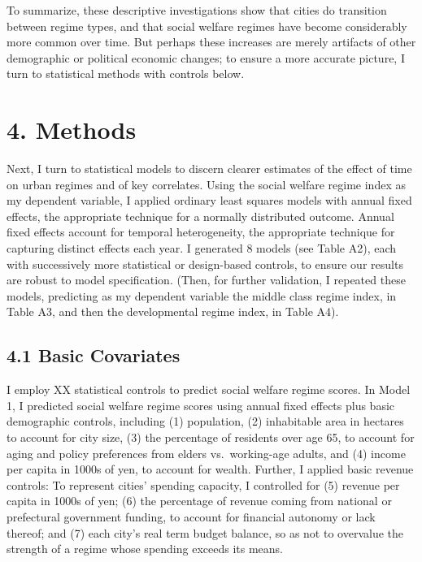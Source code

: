 \documentclass[preprint, 3p,
authoryear]{elsarticle} %
\begin{document}
To summarize, these descriptive investigations show that cities do
transition between regime types, and that social welfare regimes have
become considerably more common over time. But perhaps these increases
are merely artifacts of other demographic or political economic changes;
to ensure a more accurate picture, I turn to statistical methods with
controls below.

\hypertarget{methods}{%
\section{4. Methods}\label{methods}}

Next, I turn to statistical models to discern clearer estimates of the
effect of time on urban regimes and of key correlates. Using the social
welfare regime index as my dependent variable, I applied ordinary least
squares models with annual fixed effects, the appropriate technique for
a normally distributed outcome. Annual fixed effects account for
temporal heterogeneity, the appropriate technique for capturing distinct
effects each year. I generated 8 models (see Table A2), each with
successively more statistical or design-based controls, to ensure our
results are robust to model specification. (Then, for further
validation, I repeated these models, predicting as my dependent variable
the middle class regime index, in Table A3, and then the developmental
regime index, in Table A4).

\hypertarget{basic-covariates}{%
\subsection{4.1 Basic Covariates}\label{basic-covariates}}

I employ XX statistical controls to predict social welfare regime
scores. In Model 1, I predicted social welfare regime scores using
annual fixed effects plus basic demographic controls, including (1)
population, (2) inhabitable area in hectares to account for city size,
(3) the percentage of residents over age 65, to account for aging and
policy preferences from elders vs.~working-age adults, and (4) income
per capita in 1000s of yen, to account for wealth. Further, I applied
basic revenue controls: To represent cities' spending capacity, I
controlled for (5) revenue per capita in 1000s of yen; (6) the
percentage of revenue coming from national or prefectural government
funding, to account for financial autonomy or lack thereof; and (7) each
city's real term budget balance, so as not to overvalue the strength of
a regime whose spending exceeds its means.
\end{document}
